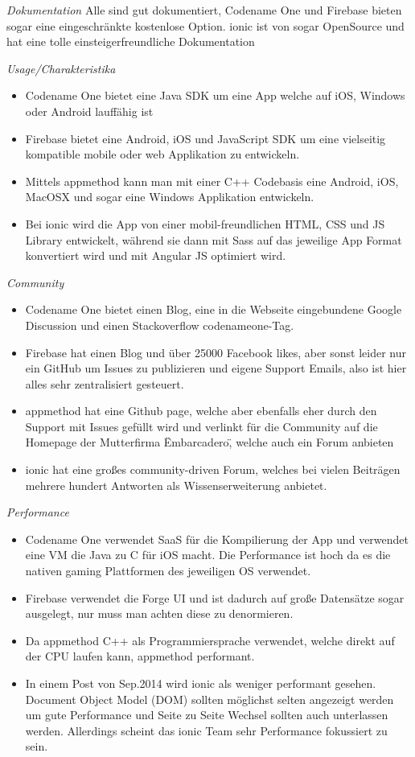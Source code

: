 \textit{Dokumentation}
Alle sind gut dokumentiert, Codename One und Firebase bieten sogar eine eingeschränkte kostenlose Option.
ionic ist von sogar OpenSource und hat eine tolle einsteigerfreundliche Dokumentation

\textit{Usage/Charakteristika}
\begin{itemize}
\item Codename One bietet eine Java SDK um eine App welche auf iOS, Windows oder Android lauffähig ist
\item Firebase bietet eine Android, iOS und JavaScript SDK um eine vielseitig kompatible mobile oder web Applikation zu entwickeln. 
\item Mittels appmethod kann man mit einer C++ Codebasis eine Android, iOS, MacOSX und sogar eine Windows Applikation entwickeln.
\item Bei ionic wird die App von einer mobil-freundlichen HTML, CSS und JS Library entwickelt, während sie dann mit Sass auf das jeweilige App Format konvertiert wird und mit Angular JS optimiert wird. 
\end{itemize}

\textit{Community}
\begin{itemize}
\item Codename One bietet einen Blog, eine in die Webseite eingebundene Google Discussion und einen Stackoverflow codenameone-Tag.
\item Firebase hat einen Blog und über 25000 Facebook likes, aber sonst leider nur ein GitHub um Issues zu publizieren und eigene Support Emails, also ist hier alles sehr zentralisiert gesteuert. 
\item appmethod hat eine Github page, welche aber ebenfalls eher durch den Support mit Issues gefüllt wird und verlinkt für die Community auf die Homepage der Mutterfirma \"Embarcadero\", welche auch ein Forum anbieten
\item ionic hat eine großes community-driven Forum, welches bei vielen Beiträgen mehrere hundert Antworten als Wissenserweiterung anbietet.
\end{itemize}

\newpage
\textit{Performance}
\begin{itemize}
\item Codename One verwendet SaaS für die Kompilierung der App und verwendet eine VM die Java zu C für iOS macht. Die Performance ist hoch da es die nativen gaming Plattformen des jeweiligen OS verwendet. 
\item Firebase verwendet die Forge UI und ist dadurch auf große Datensätze sogar ausgelegt, nur muss man achten diese zu denormieren.
\item Da appmethod C++ als Programmiersprache verwendet, welche direkt auf der CPU laufen kann, appmethod performant.
\item In einem Post von Sep.2014 wird ionic als weniger performant gesehen. Document Object Model (DOM) sollten möglichst selten angezeigt werden um gute Performance und Seite zu Seite Wechsel sollten auch unterlassen werden. Allerdings scheint das ionic Team sehr Performance fokussiert zu sein.
\end{itemize}

